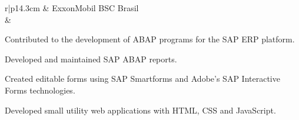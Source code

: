 \documentclass[a4paper,11pt]{article}
\begin{document}
\begin{tabular}{r|p{14.3cm}}
& ExxonMobil BSC Brasil\\
&\footnotesize{
    \begin{itemize*}[label=\textbullet]
        \item Contributed to the development of ABAP programs for the SAP ERP platform.
        \item Developed and maintained SAP ABAP reports.
        \item Created editable forms using SAP Smartforms and Adobe's SAP Interactive Forms technologies.
        \item Developed small utility web applications with HTML, CSS and JavaScript.
    \end{itemize*}
}
\\ \\




\end{tabular}
\end{document}
